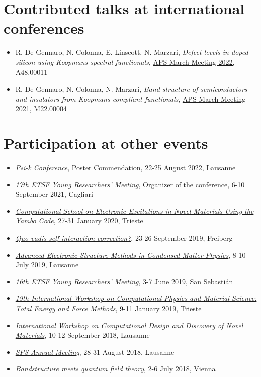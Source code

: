 \section*{Contributed talks at international conferences}

\begin{itemize}
    \item R. De Gennaro, N. Colonna, E. Linscott, N. Marzari, \emph{Defect levels in doped silicon using Koopmans spectral functionals}, \href{https://meetings.aps.org/Meeting/MAR22/Session/A48.11}{APS March Meeting 2022, A48.00011}
    \item R. De Gennaro, N. Colonna, N. Marzari, \emph{Band structure of semiconductors and insulators from Koopmans-compliant functionals}, \href{https://meetings.aps.org/Meeting/MAR21/Session/M22.4}{APS March Meeting 2021, M22.00004}
\end{itemize}

\section*{Participation at other events}

\begin{itemize}
    \item \href{https://www.psik2022.net/home}{\emph{Psi-k Conference}}, Poster Commendation, 22-25 August 2022, Lausanne
    \item \href{https://sites.google.com/view/etsfyrm2021}{\emph{17th ETSF Young Researchers' Meeting}}, Organizer of the conference, 6-10 September 2021, Cagliari
    \item \href{https://indico.ictp.it/event/9018/}{\emph{Computational School on Electronic Excitations in Novel Materials Using the Yambo Code}}, 27-31 January 2020, Trieste
    \item \href{https://psi-k.net/report-on-quo-vadis-self-interaction-correction-qvsic-september-23-26-2019-freiberg-germany/}{\emph{Quo vadis self-interaction correction?}}, 23-26 September 2019, Freiberg
    \item \href{https://sites.google.com/view/eth-electronic-structure-2019}{\emph{Advanced Electronic Structure Methods in Condensed Matter Physics}}, 8-10 July 2019, Lausanne
    \item \href{https://www.etsf.eu/node/113}{\emph{16th ETSF Young Researchers' Meeting}}, 3-7 June 2019, San Sebasti\'{a}n
    \item \href{https://indico.ictp.it/event/8658/}{\emph{19th International Workshop on Computational Physics and Material Science: Total Energy and Force Methods}}, 9-11 January 2019, Trieste
    \item \href{https://sites.google.com/view/comdi2018/home?authuser=0}{\emph{International Workshop on Computational Design and Discovery of Novel Materials}}, 10-12 September 2018, Lausanne
    \item \href{https://www.sps.ch/en/events/sps-annual-meeting-2018/}{\emph{SPS Annual Meeting}}, 28-31 August 2018, Lausanne
    \item \href{https://www.cecam.org/workshop-details/238}{\emph{Bandstructure meets quantum field theory}}, 2-6 July 2018, Vienna
\end{itemize}

